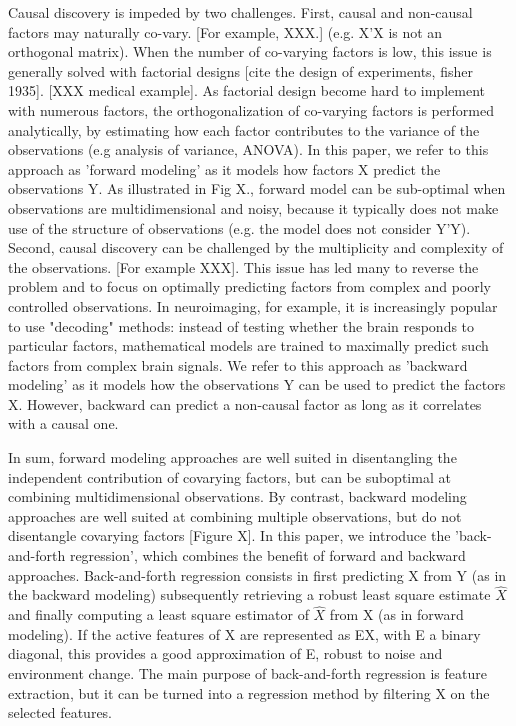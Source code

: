 \documentclass{article}
\begin{document}
%
Causal discovery is impeded by two challenges.
%
First, causal and non-causal factors may naturally co-vary. [For example, XXX.] (e.g. X'X is not an orthogonal matrix). When the number of co-varying factors is low, this issue is generally solved with factorial designs [cite the design of experiments, fisher 1935]. [XXX medical example]. As factorial design become hard to implement with numerous factors, the orthogonalization of co-varying factors is performed analytically, by estimating how each factor contributes to the variance of the observations (e.g analysis of variance, ANOVA). In this paper, we refer to this approach as 'forward modeling' as it models how factors X predict the observations Y. As illustrated in Fig X., forward model can be sub-optimal when observations are multidimensional and noisy, because it typically does not make use of the structure of observations (e.g. the model does not consider Y'Y).
%
Second, causal discovery can be challenged by the multiplicity and complexity of the observations. [For example XXX]. This issue has led many to reverse the problem and to focus on optimally predicting factors from complex and poorly controlled observations. In neuroimaging, for example, it is increasingly popular to use "decoding" methods: instead of testing whether the brain responds to particular factors, mathematical models are trained to maximally predict such factors from complex brain signals. We refer to this approach as 'backward modeling' as it models how the observations Y can be used to predict the factors X. However, backward can predict a non-causal factor as long as it correlates with a causal one.

%
In sum, forward modeling approaches are well suited in disentangling the independent contribution of covarying factors, but can be suboptimal at combining multidimensional observations. By contrast, backward modeling approaches are well suited at combining multiple observations, but do not disentangle covarying factors [Figure X].
%
In this paper, we introduce the 'back-and-forth regression', which combines the benefit of forward and backward approaches. Back-and-forth regression consists in first predicting X from Y (as in the backward modeling) subsequently retrieving a robust least square estimate $\hat X$ and finally computing a least square estimator of $\hat X$ from X (as in forward modeling).
%
If the active features of X are represented as EX, with E a binary diagonal, this provides a good approximation of E, robust to noise and environment change.
%
The main purpose of back-and-forth regression is feature extraction, but it can be turned into a regression method by filtering X on the selected features.
\end{document}
